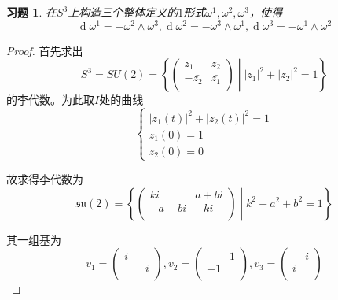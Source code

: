 \documentclass[winfonts,UTF8,c5size,a4paper,fancyhdr,hyperref,titlepage,nocap]{ctexart}
\newtheorem{xiti}{习题}
\theoremstyle{definition}
\theoremstyle{remark}
\numberwithin{equation}{subsection}
\newcommand{\dd}{\operatorname{d}}
\begin{document}
\begin{xiti}
  在$S^3$上构造三个整体定义的$1$形式$\omega^1,\omega^2,\omega^3$，使得
  \begin{equation*}
    \dd\omega^1=-\omega^2\wedge\omega^3, \dd\omega^2=-\omega^3\wedge\omega^1, \dd\omega^3=-\omega^1\wedge\omega^2
  \end{equation*}
\end{xiti}
\begin{proof}
  首先求出
  \begin{equation*}
  S^3=SU(2)=\left\{\begin{pmatrix}
                     z_1 & z_2 \\
                     -\bar{z_2} & \bar{z_1} \\
                   \end{pmatrix}
                   \middle|
                   |z_1|^2+|z_2|^2=1
                   \right\}
  \end{equation*}
  的李代数。为此取$I$处的曲线
  \begin{equation*}
    \begin{cases}
      |z_1(t)|^2+|z_2(t)|^2=1\\
      z_1(0)=1\\
      z_2(0)=0
    \end{cases}
  \end{equation*}

  故求得李代数为
  \begin{equation*}
  \mathfrak{su}(2)=\left\{\begin{pmatrix}
                     ki & a+bi \\
                     -a+bi & -ki \\
                   \end{pmatrix}
                   \middle|
                   k^2+a^2+b^2=1
                   \right\}
  \end{equation*}

  其一组基为
  \begin{equation*}
    v_1=\begin{pmatrix}
      i &  \\
       & -i \\
    \end{pmatrix}
    , v_2=\begin{pmatrix}
       & 1 \\
      -1 &  \\
    \end{pmatrix}
    , v_3=\begin{pmatrix}
       & i \\
      i &  \\
    \end{pmatrix}
  \end{equation*}


\end{proof}
\end{document}
